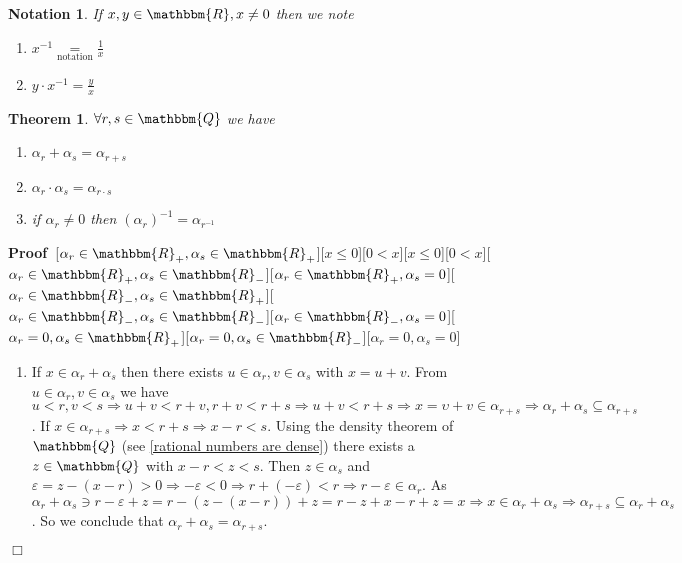 \documentclass{book}
\newcommand{\equallim}{\mathop{=}\limits}
\newcommand{\tmop}[1]{\ensuremath{\operatorname{#1}}}
\newcommand{\um}{-}
\newcommand{\upl}{+}
\newenvironment{proof}{\noindent\textbf{Proof\ }}{\hspace*{\fill}$\Box$\medskip}
\newtheorem{notation}{Notation}
{\theorembodyfont{\rmfamily}\newtheorem{note}{Note}}
\newtheorem{theorem}{Theorem}
\begin{document}
{{\begin{notation}
  If $x, y \in \mathbbm{R}, x \neq 0$ then we note
  \begin{enumerate}
    \item $x^{- 1} \equallim_{\tmop{notation}} \frac{1}{x}$
    
    \item $y \cdot x^{- 1} = \frac{y}{x}$
  \end{enumerate}
\end{notation}

\begin{theorem}
  \label{sum and product of rational cuts}$\forall r, s \in \mathbbm{Q}$ we
  have
  \begin{enumerate}
    \item $\alpha_r \upl \alpha_s = \alpha_{r \upl s}$
    
    \item $\alpha_r \cdot \alpha_s = \alpha_{r \cdot s}$
    
    \item if $\alpha_r \neq 0$ then $(\alpha_r)^{- 1} = \alpha_{r^{- 1}}$
  \end{enumerate}
\end{theorem}

\begin{proof}[$\alpha_r \in \mathbbm{R}_+, \alpha_s \in \mathbbm{R}_+$][$x
\leqslant 0$][$0 < x$][$x \leqslant 0$][$0 < x$][$\alpha_r \in \mathbbm{R}_+,
\alpha_s \in \mathbbm{R}_-$][$\alpha_r \in \mathbbm{R}_+, \alpha_s =
0$][$\alpha_r \in \mathbbm{R}_-, \alpha_s \in \mathbbm{R}_+$][$\alpha_r \in
\mathbbm{R}_-, \alpha_s \in \mathbbm{R}_-$][$\alpha_r \in \mathbbm{R}_-,
\alpha_s = 0$][$\alpha_r = 0, \alpha_s \in \mathbbm{R}_+$][$\alpha_r = 0,
\alpha_s \in \mathbbm{R}_-$][$\alpha_r = 0, \alpha_s = 0$]
  
  \begin{enumerate}
    \item If $x \in \alpha_r \upl \alpha_s$ then there exists $u \in \alpha_r,
    v \in \alpha_s$ with $x = u \upl v$. From $u \in \alpha_r, v \in \alpha_s$
    we have $u < r, v < s \Rightarrow u \upl v < r \upl v, r \upl v < r \upl s
    \Rightarrow u \upl v < r \upl s \Rightarrow x = \upsilon \upl v \in
    \alpha_{r \upl s} \Rightarrow \alpha_r \upl \alpha_s \subseteq \alpha_{r
    \upl s}$. If $x \in \alpha_{r \upl s} \Rightarrow x < r \upl s \Rightarrow
    x \um r < s$. Using the density theorem of $\mathbbm{Q}$ (see
    \ref{rational numbers are dense}) there exists a $z \in \mathbbm{Q}$ with
    $x \um r < z < s$. Then $z \in \alpha_s$ and $\varepsilon = z \um (x \um
    r) > 0 \Rightarrow \um \varepsilon < 0 \Rightarrow r \upl (- \varepsilon)
    < r \Rightarrow r \um \varepsilon \in \alpha_r$. As $\alpha_r \upl
    \alpha_s \ni r \um \varepsilon + z = r - (z \um (x \um r)) \upl z = r \um
    z \upl x \um r + z = x \Rightarrow x \in \alpha_r \upl \alpha_s
    \Rightarrow \alpha_{r \upl s} \subseteq \alpha_r \upl \alpha_s$. So we
    conclude that $\alpha_r \upl \alpha_s = \alpha_{r \upl s}$.
    

\end{enumerate}
\end{proof}}}
\end{document}

